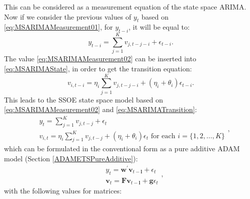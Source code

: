 \documentclass[
]{book}
\theoremstyle{definition}
\theoremstyle{definition}
\theoremstyle{definition}
\theoremstyle{definition}
\theoremstyle{remark}
\begin{document}
This can be considered as a measurement equation of the state space ARIMA. Now if we consider the previous values of \(y_t\) based on \eqref{eq:MSARIMAMeasurement01}, for \(y_{t-i}\), it will be equal to:
\begin{equation}
  y_{t-i} = \sum_{j=1}^K v_{j,t-j-i} + \epsilon_{t-i} .
  \label{eq:MSARIMAMeasurement02}
\end{equation}
The value \eqref{eq:MSARIMAMeasurement02} can be inserted into \eqref{eq:MSARIMAState}, in order to get the transition equation:
\begin{equation}
  v_{i,t-i} = \eta_i \sum_{j=1}^K v_{j,t-j-i} + (\eta_i + \theta_i) \epsilon_{t-i}.
  \label{eq:MSARIMATransition}
\end{equation}
This leads to the SSOE state space model based on \eqref{eq:MSARIMAMeasurement02} and \eqref{eq:MSARIMATransition}:
\begin{equation}
  \begin{aligned}
    &{y}_{t} = \sum_{j=1}^K v_{j,t-j} + \epsilon_t \\
    &v_{i,t} = \eta_i \sum_{j=1}^K v_{j,t-j} + (\eta_i + \theta_i) \epsilon_{t} \text{ for each } i=\{1, 2, \dots, K \}
  \end{aligned},
  \label{eq:ADAMARIMAExpanded}
\end{equation}
which can be formulated in the conventional form as a pure additive ADAM model (Section \ref{ADAMETSPureAdditive}):
\begin{equation*}
  \begin{aligned}
    &{y}_{t} = \mathbf{w}^\prime \mathbf{v}_{t-\mathbf{l}} + \epsilon_t \\
    &\mathbf{v}_{t} = \mathbf{F} \mathbf{v}_{t-\mathbf{l}} + \mathbf{g} \epsilon_t
  \end{aligned},
\end{equation*}
with the following values for matrices:
\end{document}
